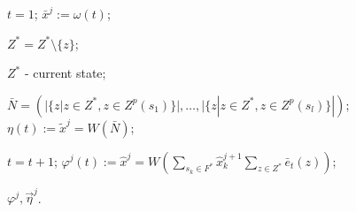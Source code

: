 	\Statex {}
	
	\State $t=1$;
	 \label{alst:cycle_start}
		\State $\bar x^j:=\omega(t)$;
	
			 \label{alst:update_z}
				\State $Z^*=Z^*\setminus\{z\}$;
			\EndIf
		\EndFor
	
		\State $Z^*$ - current state; 
		
		\State $\bar N=(|\{z|z\in Z^*,z\in Z^p(s_1)\}|,\dots,|\{z|z\in Z^*,z\in Z^p(s_l)\}|)$; \label{alst:calc_out1}
		\State $\eta(t):=\tilde x^j=W(\bar N)$; \label{alst:calc_out3}
	
		\State $t=t+1$;
			\State $\varphi^j(t):=\hat x^j=W(\sum_{s_k\in F^*}\hat x_k^{j+1}\sum_{z\in Z^*}\bar e_t(z))$; \label{alst:calc_state1}
		\EndIf
	\EndWhile \label{alst:cycle_end}
	
	\Return $\varphi^j,\vec\eta^j$.